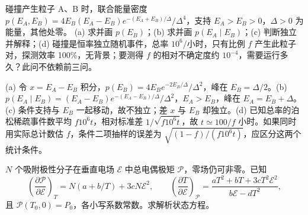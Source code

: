 \begin{exercise}
碰撞产生粒子 A、B 时，联合能量密度 $p(E_A,E_B)=4E_B(E_A-E_B)e^{-(E_A+E_B)/\Delta}/\Delta^4$，支持 $E_A>E_B>0$，$\Delta>0$ 为能量，其他处零。
(a) 求并画 $p(E_B)$；(b) 求并画 $p(E_A\mid E_B)$；(c) 判断独立并解释；(d) 碰撞是恒率独立随机事件，总率 $10^6$/小时，只有比例 $f$ 产生此粒子对，探测效率 100\%，无背景；要测得 $f$ 的相对不确定度约 $10^{-4}$，需要运行多久？此问不依赖前三问。
\end{exercise}
\begin{solution}
(a) 令 $x=E_A-E_B$ 积分，$p(E_B)=4E_Be^{-2E_B/\Delta}/\Delta^2$，峰在 $E_B=\Delta/2$。(b) $p(E_A\mid E_B)=(E_A-E_B)e^{-(E_A-E_B)/\Delta}/\Delta^2$，$E_A>E_B$，峰在 $E_A=E_B+\Delta$。(c) 条件支持与 $E_B$ 一起移动，故不独立；差 $x$ 与 $E_B$ 却独立。(d) 已知总率的泊松稀疏事件数平均 $f10^6t$，相对标准差 $1/\sqrt{f10^6t}$，故 $t\simeq100/f$ 小时。如果同时用实际总计数估 $f$，条件二项抽样的误差为 $\sqrt{(1-f)/(f10^6t)}$，应区分这两个统计条件。
\end{solution}
\begin{center}\hspace{.2cm}\end{center}
\begin{exercise}
$N$ 个吸附极性分子在垂直电场 $\mathcal E$ 中总电偶极矩 $\mathcal P$，零场仍可非零。已知
\[\left(\frac{\partial\mathcal P}{\partial\mathcal E}\right)_T=N(a+b/T)+3cN\mathcal E^2,\qquad
\left(\frac{\partial T}{\partial\mathcal E}\right)_{\mathcal P}=\frac{aT^2+bT+3cT^2\mathcal E^2}{b\mathcal E-dT^2},\]
且 $\mathcal P(T_0,0)=P_0$，各小写系数常数。求解析状态方程。
\end{exercise}
